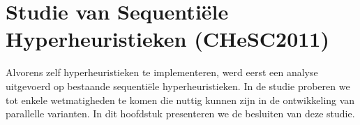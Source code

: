 \chapter{Studie van Sequenti\"ele Hyperheuristieken (CHeSC2011)}


Alvorens zelf hyperheuristieken te implementeren, werd eerst een analyse uitgevoerd op bestaande sequenti\"ele hyperheuristieken. In de studie proberen we tot enkele wetmatigheden te komen die nuttig kunnen zijn in de ontwikkeling van parallelle varianten. In dit hoofdstuk presenteren we de besluiten van deze studie.







%






